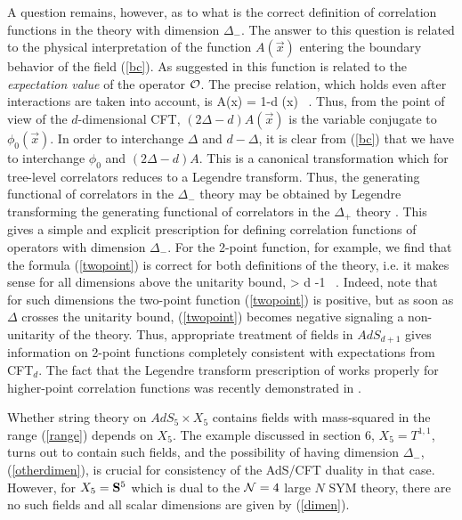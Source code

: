 A question remains, however, as to what is the correct definition
of correlation functions in the theory with dimension $\Delta_-$.
The answer to this question is related to the physical interpretation
of the function $A(\vec x)$ entering the boundary behavior of the
field (\ref{bc}). As suggested in \cite{BKL} this function is related
to the {\it expectation value} of the operator ${\cal O}$.
The precise relation, which holds even after interactions are taken into
account, is \cite{KWnew}
\be
A(\vec x) = {1\Delta -d}  (\vec x) \rangle
\ .
\ee
Thus, from the point of view of the $d$-dimensional
CFT, $(2\Delta - d) A(\vec x)$
is the variable conjugate to $\phi_0(\vec x)$.
In order to interchange $\Delta$ and $d-\Delta$, it is clear from
(\ref{bc}) that we have to interchange $\phi_0$ and $(2\Delta - d) A$. 
This is a canonical transformation which for tree-level correlators
reduces to a Legendre transform. Thus, the generating functional of
correlators in the $\Delta_-$ theory may be obtained by Legendre
transforming the generating functional of correlators in the $\Delta_+$
theory \cite{KWnew}. This gives a simple and explicit prescription for defining
correlation functions of operators with dimension
$\Delta_-$. For the 2-point function, for example, we find 
that the formula (\ref{twopoint})
is correct for both definitions of the theory, i.e. it makes sense
for all dimensions above the unitarity bound,
\be
\Delta > {d} -1
\ .
\ee
Indeed, note that for such dimensions 
the two-point function (\ref{twopoint}) is positive,
but as soon as $\Delta$ crosses the unitarity bound,
(\ref{twopoint})
becomes negative signaling a non-unitarity of the theory.
Thus, appropriate treatment of fields in $AdS_{d+1}$ gives information
on 2-point functions completely consistent with expectations from 
CFT$_d$. The fact that the Legendre transform prescription of
\cite{KWnew} works properly for higher-point correlation functions
was recently demonstrated in \cite{MW}.



Whether string theory on $AdS_5 \times X_5$ contains fields with 
mass-squared
in the range (\ref{range}) depends on $X_5$. The example discussed
in section 6, $X_5=T^{1,1}$, turns out to contain such fields, and the
possibility of having dimension $\Delta_-$, (\ref{otherdimen}), 
is crucial for 
consistency of the AdS/CFT duality in that case. However, 
for $X_5={\bf S}^5$ which is dual
to the ${\cal N}=4$ large $N$ SYM theory, there are no such fields
and all scalar dimensions are given by (\ref{dimen}).

